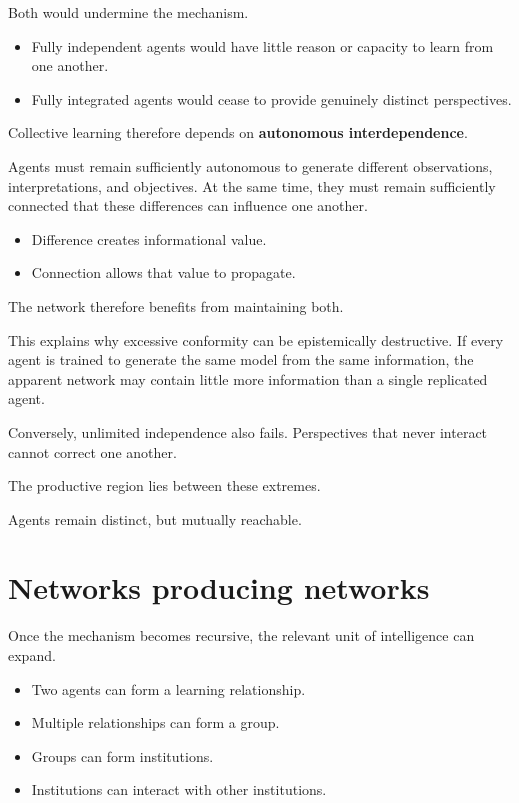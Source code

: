 \documentclass[11pt, a4paper]{article}
\begin{document}
Both would undermine the mechanism.

\begin{itemize}[leftmargin=*]
    \item Fully independent agents would have little reason or capacity to learn from one another.
    \item Fully integrated agents would cease to provide genuinely distinct perspectives.
\end{itemize}

Collective learning therefore depends on \textbf{autonomous interdependence}.

Agents must remain sufficiently autonomous to generate different observations, interpretations, and objectives. At the same time, they must remain sufficiently connected that these differences can influence one another.

\begin{itemize}[leftmargin=*]
    \item Difference creates informational value.
    \item Connection allows that value to propagate.
\end{itemize}

The network therefore benefits from maintaining both.

This explains why excessive conformity can be epistemically destructive. If every agent is trained to generate the same model from the same information, the apparent network may contain little more information than a single replicated agent.

Conversely, unlimited independence also fails. Perspectives that never interact cannot correct one another.

The productive region lies between these extremes.

Agents remain distinct, but mutually reachable.

\section{Networks producing networks}
Once the mechanism becomes recursive, the relevant unit of intelligence can expand.

\begin{itemize}[leftmargin=*]
    \item Two agents can form a learning relationship.
    \item Multiple relationships can form a group.
    \item Groups can form institutions.
    \item Institutions can interact with other institutions.
\end{itemize}
\end{document}
